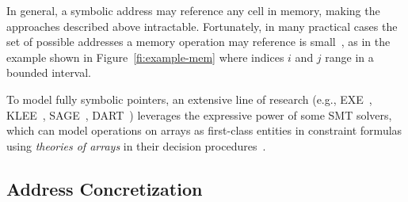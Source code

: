 \begin{itemize}



\end{itemize}

\noindent In general, a symbolic address may reference any cell in memory, making the approaches described above intractable. Fortunately, in many practical cases the set of possible addresses a memory operation may reference is small~\cite{BITBLAZE-ICISS08}, as in the example shown in Figure~\ref{fi:example-mem} where indices $i$ and $j$ range in a bounded interval. 



To model fully symbolic pointers, an extensive line of research  (e.g., {\sc EXE}~\cite{EXE-CCS06}, {\sc KLEE}~\cite{KLEE-OSDI08}, {\sc SAGE}~\cite{SAGE-NDSS08}, {\sc DART}~\cite{DART-PLDI05}) leverages the expressive power of some SMT solvers, which can model operations on arrays as first-class entities in constraint formulas using {\em theories of arrays} in their decision procedures~\cite{STP-CAV07}. 

\subsection{Address Concretization}
\label{ss:address-concretization}

